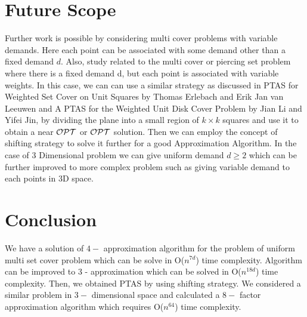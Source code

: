 \documentclass[a4paper,10pt]{article}  %
\begin{document}
	\section{Future Scope}
	Further work is possible by considering multi cover problems with variable demands. Here each point can be associated with some demand other than a fixed demand $d$. Also, study related to the multi cover or piercing set problem where there is a fixed demand d, but each point is associated with variable weights. In this case, we can can use a similar strategy as discussed in PTAS for Weighted Set Cover on Unit Squares by Thomas Erlebach and Erik Jan van Leeuwen \cite{ErlebachL10} and A PTAS for the Weighted Unit Disk Cover Problem by Jian Li and Yifei Jin\cite{LiJ15}, by dividing the plane into a small region of $k \times k$ squares and use it to obtain a near ${\cal OPT}$ or ${\cal OPT}$ solution. Then we can employ the concept of shifting strategy to solve it further for a good Approximation Algorithm.
	In the case of 3 Dimensional problem we can give uniform demand $d \geq 2$ which can be further improved to more complex problem such as giving variable demand to each points in 3D space.
	
	
	
	\section{Conclusion}
	
	We have a solution of $4 -$ approximation algorithm for the problem of uniform multi set cover problem which can be solve in O($n^{7d}$) time complexity. Algorithm can be improved to 3 - approximation which can be solved in O($n^{18d}$) time complexity. Then, we obtained PTAS by using shifting strategy. We considered a similar problem in $3 - $ dimensional space and calculated a $8 -$ factor approximation algorithm which requires O($n^{64}$) time complexity. 
	
	
	
	
	
	
	
	
	
\end{document}
